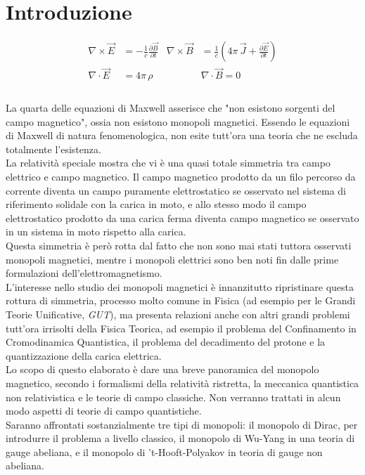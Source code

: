 \chapter*{Introduzione}
\begin{equation*}
   \begin{aligned}
      \nabla \times \vec E & = -\frac{1}{c}\frac{\partial \vec B}{\partial t}&
      \nabla \times \vec B & = \frac{1}{c} \left(
         4\pi \, \vec J + \frac{\partial \vec E}{\partial t} \right) \\
      \nabla \cdot \vec E & = 4\pi \, \rho &
      &\boxed{\nabla \cdot \vec B = 0} \\
   \end{aligned}
\end{equation*}\\

La quarta delle equazioni di Maxwell asserisce che "non esistono sorgenti del
campo magnetico", ossia non esistono monopoli magnetici. Essendo le equazioni di
Maxwell di natura fenomenologica, non esite tutt'ora una teoria che ne escluda
totalmente l'esistenza. \\
La relatività speciale mostra che vi è una quasi totale simmetria tra campo elettrico
e campo magnetico. Il campo magnetico prodotto da un filo percorso da corrente
diventa un campo puramente elettrostatico se osservato nel sistema di riferimento
solidale con la carica in moto, e allo stesso modo il campo elettrostatico prodotto
da una carica ferma diventa campo magnetico se osservato in un sistema in moto rispetto
alla carica.\\
Questa simmetria è però rotta dal fatto che non sono mai stati tuttora osservati
monopoli magnetici, mentre i monopoli elettrici sono ben noti fin dalle prime
formulazioni dell'elettromagnetismo.\\
L'interesse nello studio dei monopoli magnetici è innanzitutto ripristinare
questa rottura di simmetria, processo molto comune in Fisica (ad esempio per le
Grandi Teorie Unificative, \emph{GUT}), ma presenta relazioni anche con altri
grandi problemi tutt'ora irrisolti della Fisica Teorica, ad esempio il problema
del Confinamento in Cromodinamica Quantistica, il problema del decadimento del
protone e la quantizzazione della carica elettrica.\\

Lo scopo di questo elaborato è dare una breve panoramica del monopolo magnetico,
secondo i formalismi della relatività ristretta, la meccanica quantistica non
relativistica e le teorie di campo classiche. Non verranno trattati in alcun modo
aspetti di teorie di campo quantistiche. \\
Saranno affrontati sostanzialmente tre tipi di monopoli: il monopolo di Dirac,
per introdurre il problema a livello classico, il monopolo di Wu-Yang in una
teoria di gauge abeliana, e il monopolo di 't-Hooft-Polyakov in teoria di gauge
non abeliana.
